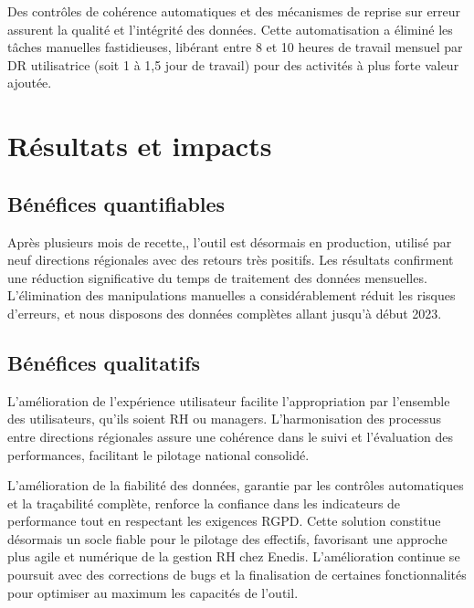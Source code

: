 Des contrôles de cohérence automatiques et des mécanismes de reprise sur erreur assurent la qualité et l'intégrité des données. Cette automatisation a éliminé les tâches manuelles fastidieuses, libérant entre 8 et 10 heures de travail mensuel par DR utilisatrice (soit 1 à 1,5 jour de travail) pour des activités à plus forte valeur ajoutée.

\section{Résultats et impacts}

\subsection{Bénéfices quantifiables}
Après plusieurs mois de recette,, l'outil est désormais en production, utilisé par neuf directions régionales avec des retours très positifs. Les résultats confirment une réduction significative du temps de traitement des données mensuelles. L'élimination des manipulations manuelles a considérablement réduit les risques d'erreurs, et nous disposons des données complètes allant jusqu'à début 2023.

\subsection{Bénéfices qualitatifs}
L'amélioration de l'expérience utilisateur facilite l'appropriation par l'ensemble des utilisateurs, qu'ils soient RH ou managers. L'harmonisation des processus entre directions régionales assure une cohérence dans le suivi et l'évaluation des performances, facilitant le pilotage national consolidé.

L'amélioration de la fiabilité des données, garantie par les contrôles automatiques et la traçabilité complète, renforce la confiance dans les indicateurs de performance tout en respectant les exigences RGPD. Cette solution constitue désormais un socle fiable pour le pilotage des effectifs, favorisant une approche plus agile et numérique de la gestion RH chez Enedis. L'amélioration continue se poursuit avec des corrections de bugs et la finalisation de certaines fonctionnalités pour optimiser au maximum les capacités de l'outil.